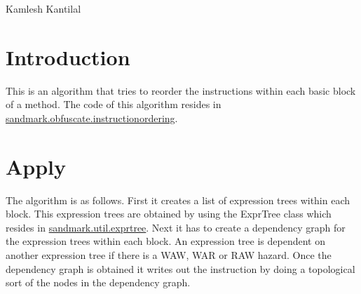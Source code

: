 %
          {Kamlesh Kantilal}

\section{Introduction}
This is an algorithm that tries to reorder the instructions within each basic block of a method. The code of this algorithm resides in \url{sandmark.obfuscate.instructionordering}.

\section{Apply}
The algorithm is as follows. First it creates a list of expression trees within each block. This expression trees are obtained by using the ExprTree class which resides in \url{sandmark.util.exprtree}.
Next it has to create a dependency graph for the expression trees within each block. An expression tree is dependent on another expression tree if there is a WAW, WAR or RAW hazard. 
Once the dependency graph is obtained it writes out the instruction by doing a topological sort of the nodes in the dependency graph. 

